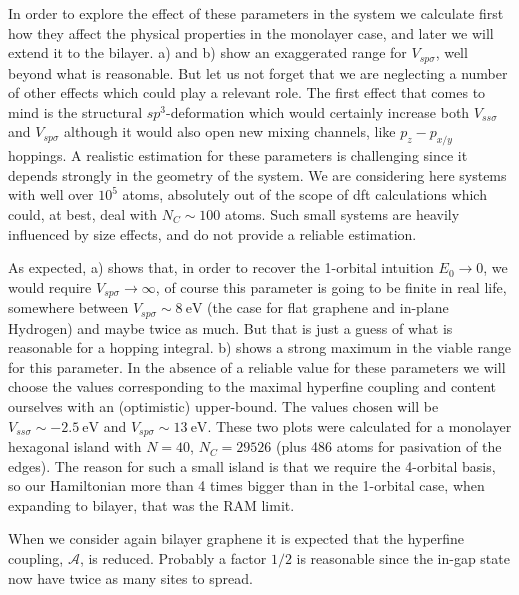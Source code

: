 In order to explore the effect of these parameters in the system we calculate first how they affect the physical properties in the monolayer case, and later we will extend it to the bilayer.
a) and b) show an exaggerated range for $V_{sp\sigma}$, well beyond what is reasonable. But let us not forget that we are neglecting a number of other effects which could play a relevant role. The first effect that comes to mind is the structural $sp^3$-deformation which would certainly increase both $V_{ss\sigma}$ and $V_{sp\sigma}$ although it would also open new mixing channels, like $p_z-p_{x/y}$ hoppings.
A realistic estimation for these parameters is challenging since it depends strongly in the geometry of the system. We are considering here systems with well over $10^5$ atoms, absolutely out of the scope of \ac{dft} calculations which could, at best, deal with $N_C\sim100$ atoms. Such small systems are heavily influenced by size effects, and do not provide a reliable estimation.



As expected, a) shows that, in order to recover the 1-orbital intuition $E_0\to 0$, we would require $V_{sp\sigma}\to\infty$, of course this parameter is going to be finite in real life, somewhere between $V_{sp\sigma}\sim\SI{8}{\eV}$ (the case for flat graphene and in-plane Hydrogen) and maybe twice as much. But that is just a guess of what is reasonable for a hopping integral.
b) shows a strong maximum in the viable range for this parameter.
In the absence of a reliable value for these parameters we will choose the values corresponding to the maximal hyperfine coupling and content ourselves with an (optimistic) upper-bound. The values chosen will be $V_{ss\sigma}\sim\SI{-2.5}{\eV}$ and $V_{sp\sigma}\sim\SI{13}{\eV}$.
These two plots were calculated for a monolayer hexagonal island with $N=40$, $N_C=29526$ (plus 486  atoms for pasivation of the edges). The reason for such a small island is that we require the 4-orbital basis, so our Hamiltonian more than 4 times bigger than in the 1-orbital case, when expanding to bilayer, that was the RAM limit.


When we consider again bilayer graphene it is expected that the hyperfine coupling, $\mathcal{A}$, is reduced. Probably a factor $1/2$ is reasonable since the in-gap state now have twice as many sites to spread. 

